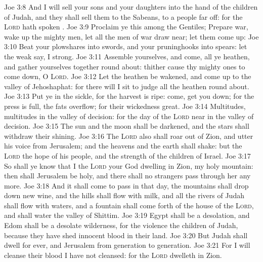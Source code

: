 \vs Joe 3:8 And I will sell your sons and your daughters into the hand of the children of Judah, and they shall sell them to the Sabeans, to a people far off: for the \textsc{Lord} hath spoken .
\vs Joe 3:9 Proclaim ye this among the Gentiles; Prepare war, wake up the mighty men, let all the men of war draw near; let them come up:
\vs Joe 3:10 Beat your plowshares into swords, and your pruninghooks into spears: let the weak say, I  strong.
\vs Joe 3:11 Assemble yourselves, and come, all ye heathen, and gather yourselves together round about: thither cause thy mighty ones to come down, O \textsc{Lord}.
\vs Joe 3:12 Let the heathen be wakened, and come up to the valley of Jehoshaphat: for there will I sit to judge all the heathen round about.
\vs Joe 3:13 Put ye in the sickle, for the harvest is ripe: come, get you down; for the press is full, the fats overflow; for their wickedness  great.
\vs Joe 3:14 Multitudes, multitudes in the valley of decision: for the day of the \textsc{Lord}  near in the valley of decision.
\vs Joe 3:15 The sun and the moon shall be darkened, and the stars shall withdraw their shining.
\vs Joe 3:16 The \textsc{Lord} also shall roar out of Zion, and utter his voice from Jerusalem; and the heavens and the earth shall shake: but the \textsc{Lord}  the hope of his people, and the strength of the children of Israel.
\vs Joe 3:17 So shall ye know that I  the \textsc{Lord} your God dwelling in Zion, my holy mountain: then shall Jerusalem be holy, and there shall no strangers pass through her any more.
\vs Joe 3:18 And it shall come to pass in that day,  the mountains shall drop down new wine, and the hills shall flow with milk, and all the rivers of Judah shall flow with waters, and a fountain shall come forth of the house of the \textsc{Lord}, and shall water the valley of Shittim.
\vs Joe 3:19 Egypt shall be a desolation, and Edom shall be a desolate wilderness, for the violence  the children of Judah, because they have shed innocent blood in their land.
\vs Joe 3:20 But Judah shall dwell for ever, and Jerusalem from generation to generation.
\vs Joe 3:21 For I will cleanse their blood  I have not cleansed: for the \textsc{Lord} dwelleth in Zion.
